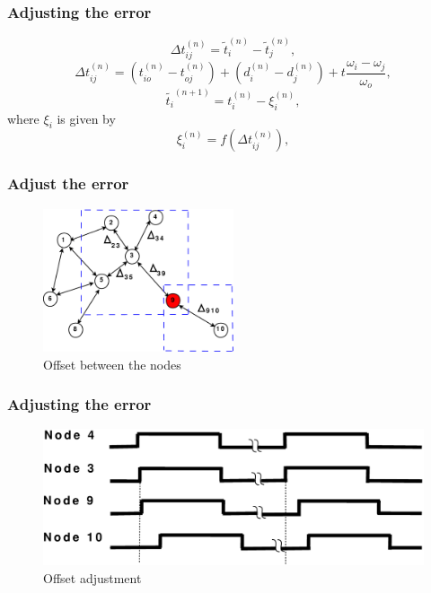 \documentclass[t]{beamer}
\begin{document}
\begin{frame}
    \frametitle{Adjusting the error}
\begin{equation}
\Delta t_{ij}^{(n)} = \tilde t_i^{(n)}  - \tilde t_j^{(n)}  ,
\end{equation}
\newline
\begin{equation}
 \Delta t_{ij}^{(n)} = (t_{io}^{(n)} - t_{oj}^{(n)}) + (d_i^{(n)}-d_j^{(n)}) + t\frac{\omega_i - \omega_j}{\omega_o} ,
\end{equation}
\newline
\begin{equation}
\tilde{t_i}^{(n+1)} = t_i^{(n)} - \xi_i^{(n)} ,
\end{equation}
where $\xi_i$ is given by
\begin{equation}
\xi_i^{(n)} = f(\Delta t_{ij}^{(n)}) ,
\end{equation}
\end{frame}
\begin{frame}
\frametitle{Adjust the error}
\begin{figure}
\centering
\includegraphics[width=0.5\textwidth]{node_field}
\caption{Offset between the nodes}
\end{figure}
\end{frame}
\begin{frame}
\frametitle{Adjusting the error}
\begin{figure}
\centering
\includegraphics[width=1\textwidth]{offsetpic}
\caption{Offset adjustment}
\end{figure}
\end{frame}
\end{document}
